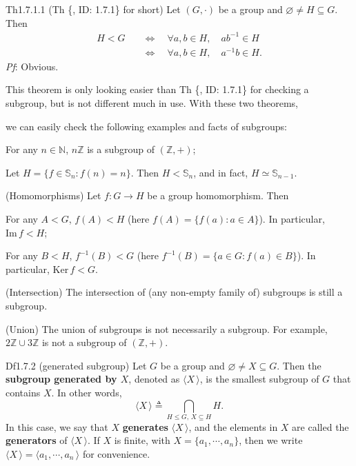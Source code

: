 \documentclass{article}
\newcommand{\Ker}{\text{Ker}\,}
\newcommand{\Ima}{\text{Im}\,}
\begin{document}
\begin{Th}{Th1.7.1.1 (Th \{, ID: 1.7.1\} for short)}
    Let $(G, \cdot)$ be a group and $\varnothing\neq H\subseteq G$. Then
    $$ \begin{aligned}
        H < G \quad & \Longleftrightarrow \quad \forall a, b\in H, \quad ab^{-1}\in H \\ \quad & \Longleftrightarrow \quad \forall a, b\in H, \quad a^{-1}b\in H. 
    \end{aligned} $$
    \tcblower
    \textit{Pf}: Obvious.
\end{Th}

\begin{Rmk}{}
    This theorem is only looking easier than Th \{, ID: 1.7.1\} for checking a subgroup, but is not different much in use. With these two theorems, \textcolor{Th}{we can easily check the following examples and facts of subgroups:
    \begin{compactenum}
        \item For any $n\in\mathbb{N}$, $n\mathbb{Z}$ is a subgroup of $(\mathbb{Z}, +)$;
        \item Let $H = \{f\in\mathbb{S}_n: f(n) = n\}$. Then $H<\mathbb{S}_n$, and in fact, $H\simeq\mathbb{S}_{n-1}$.
        \item (Homomorphisms) Let $f: G\to H$ be a group homomorphism. Then 
        \begin{compactenum}
            \item For any $A < G$, $f(A) < H$ (here $f(A) = \{f(a): a\in A\}$). In particular, $\Ima f < H$;
            \item For any $B < H$, $f^{-1}(B) < G$ (here $f^{-1}(B) = \{a\in G: f(a)\in B\}$). In particular, $\Ker f < G$.
        \end{compactenum}
        \item (Intersection) The intersection of (any non-empty family of) subgroups is still a subgroup.
        \item (Union) The union of subgroups is not necessarily a subgroup. For example, $2\mathbb{Z}\cup 3\mathbb{Z}$ is not a subgroup of $(\mathbb{Z}, +)$.
    \end{compactenum}}
\end{Rmk}

\begin{Df}{Df1.7.2 (generated subgroup)}
    Let $G$ be a group and $\varnothing\neq X\subseteq G$. Then the \textbf{subgroup generated by $X$}, denoted as $\langle X\,\rangle$, is the smallest subgroup of $G$ that contains $X$. In other words, 
    $$ \langle X\,\rangle \triangleq \bigcap_{H\leq G,\, X\subseteq H} H. $$
    In this case, we say that $X$ \textbf{generates} $\langle X\,\rangle$, and the elements in $X$ are called the \textbf{generators} of $\langle X\,\rangle$. If $X$ is finite, with $X = \{a_1, \cdots, a_n\}$, then we write $\langle X\,\rangle = \langle a_1, \cdots, a_n\,\rangle$ for convenience.
\end{Df}
\end{document}
